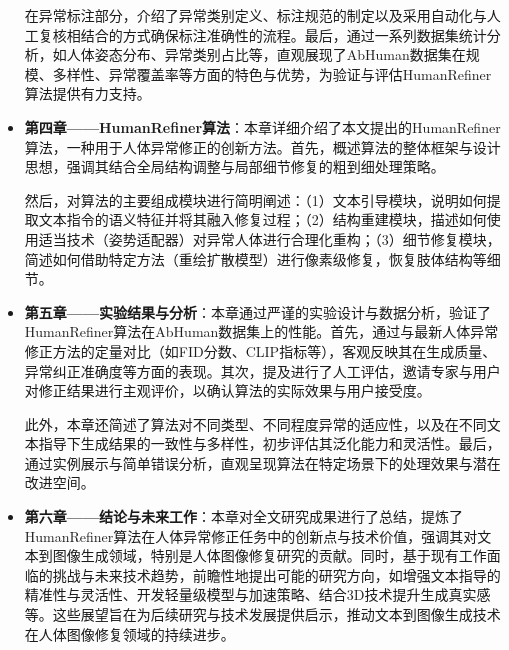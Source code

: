 \begin{itemize}
  在异常标注部分，介绍了异常类别定义、标注规范的制定以及采用自动化与人工复核相结合的方式确保标注准确性的流程。最后，通过一系列数据集统计分析，如人体姿态分布、异常类别占比等，直观展现了AbHuman数据集在规模、多样性、异常覆盖率等方面的特色与优势，为验证与评估HumanRefiner算法提供有力支持。

\item \textbf{第四章——HumanRefiner算法}：本章详细介绍了本文提出的HumanRefiner算法，一种用于人体异常修正的创新方法。首先，概述算法的整体框架与设计思想，强调其结合全局结构调整与局部细节修复的粗到细处理策略。

  然后，对算法的主要组成模块进行简明阐述：（1）文本引导模块，说明如何提取文本指令的语义特征并将其融入修复过程；（2）结构重建模块，描述如何使用适当技术（姿势适配器）对异常人体进行合理化重构；（3）细节修复模块，简述如何借助特定方法（重绘扩散模型）进行像素级修复，恢复肢体结构等细节。

\item \textbf{第五章——实验结果与分析}：本章通过严谨的实验设计与数据分析，验证了HumanRefiner算法在AbHuman数据集上的性能。首先，通过与最新人体异常修正方法的定量对比（如FID分数、CLIP指标等），客观反映其在生成质量、异常纠正准确度等方面的表现。其次，提及进行了人工评估，邀请专家与用户对修正结果进行主观评价，以确认算法的实际效果与用户接受度。

  此外，本章还简述了算法对不同类型、不同程度异常的适应性，以及在不同文本指导下生成结果的一致性与多样性，初步评估其泛化能力和灵活性。最后，通过实例展示与简单错误分析，直观呈现算法在特定场景下的处理效果与潜在改进空间。

\item \textbf{第六章——结论与未来工作}：本章对全文研究成果进行了总结，提炼了HumanRefiner算法在人体异常修正任务中的创新点与技术价值，强调其对文本到图像生成领域，特别是人体图像修复研究的贡献。同时，基于现有工作面临的挑战与未来技术趋势，前瞻性地提出可能的研究方向，如增强文本指导的精准性与灵活性、开发轻量级模型与加速策略、结合3D技术提升生成真实感等。这些展望旨在为后续研究与技术发展提供启示，推动文本到图像生成技术在人体图像修复领域的持续进步。
\end{itemize}